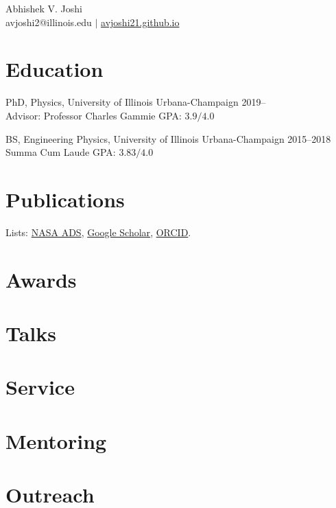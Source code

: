\documentclass[12pt]{article}
\begin{document}
\begin{center}
{\Large Abhishek V. Joshi}\\\vspace{0.5em}
avjoshi2@illinois.edu $|$ \href{https://avjoshi21.github.io}{avjoshi21.github.io}
\end{center}

\section*{Education}
PhD, Physics, University of Illinois Urbana-Champaign \hfill 2019--\\
Advisor: Professor Charles Gammie  \hfill {\small GPA: $3.9/4.0$}


BS, Engineering Physics, University of Illinois Urbana-Champaign \hfill 2015--2018\\
{\small Summa Cum Laude \hfill GPA: $3.83/4.0$}

\section*{Publications}
Lists: \href{\adslibrary}{NASA ADS}, \href{\googlescholar}{Google Scholar}, \href{https://orcid.org/0000-0002-2514-5965}{ORCID}.

\begin{etaremune}[leftmargin=1.25em]

\end{etaremune}

\section*{Awards}

\section*{Talks}


\section*{Service}

\section*{Mentoring}

\section*{Outreach}
\end{document}
